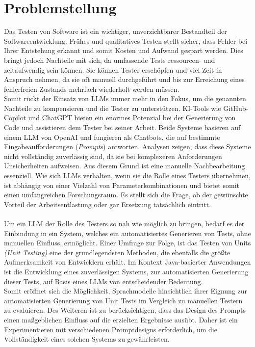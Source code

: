 \section{Problemstellung}
Das Testen von Software ist ein wichtiger, unverzichtbarer Bestandteil der Softwareentwicklung. Frühes und qualitatives Testen stellt sicher, dass
Fehler bei Ihrer Entstehung erkannt und somit Kosten und Aufwand gespart werden. Dies bringt jedoch Nachteile mit sich, da umfassende Tests ressourcen- und zeitaufwendig sein können. 
Sie können Tester erschöpfen und viel Zeit in Anspruch nehmen, da sie oft manuell durchgeführt und bis zur Erreichung eines fehlerfreien Zustands mehrfach wiederholt werden müssen. \cite{pargaonkar_study_2023}\\
Somit rückt der Einsatz von LLMs immer mehr in den Fokus, um die genannten Nachteile zu kompensieren und die Tester zu unterstützen. KI-Tools wie GitHub-Copilot und ChatGPT 
bieten ein enormes Potenzial bei der Generierung von Code und assistieren dem Tester bei seiner Arbeit. Beide Systeme basieren auf einem LLM von OpenAI 
und fungieren als Chatbots, die auf bestimmte Eingabeaufforderungen (\textit{Prompts}) antworten. Analysen zeigen, dass diese Systeme nicht vollständig zuverlässig sind, da sie bei komplexeren Anforderungen Unsicherheiten aufweisen. \cite{poldrack_ai-assisted_2023}
Aus diesem Grund ist eine manuelle Nachbearbeitung essenziell.
Wie sich LLMs verhalten, wenn sie die Rolle eines Testers übernehmen, ist abhängig von einer Vielzahl von Parameterkombinationen und bietet somit einen 
umfangreichen Forschungsraum. Es stellt sich die Frage, ob der gewünschte Vorteil der Arbeitsentlastung oder gar Ersetzung tatsächlich eintritt.
\\\\Um ein LLM der Rolle des Testers so nah wie möglich zu bringen, bedarf es der Einbindung in ein System, welches ein automatisiertes Generieren von Tests, ohne manuellen
Einfluss, ermöglicht. Einer Umfrage zur Folge, ist das Testen von Units \textit{(Unit Testing)} eine der grundlegendsten Methoden, die ebenfalls die größte Aufmerksamkeit von Entwicklern erhält. \cite{garousi_survey_2013}
Im Kontext Java-basierter Anwendungen ist die Entwicklung eines zuverlässigen Systems, zur automatisierten Generierung dieser Tests, auf Basis eines LLMs von entscheidender Bedeutung.\\
Somit eröffnet sich die Möglichkeit, Sprachmodelle hinsichtlich ihrer Eignung zur automatisierten Generierung von Unit Tests im Vergleich zu manuellen Testern zu evaluieren.
Des Weiteren ist zu berücksichtigen, dass das Design des Prompts einen maßgeblichen Einfluss auf die erzielten Ergebnisse ausübt. Daher ist ein Experimentieren mit verschiedenen Promptdesigns erforderlich, um die Vollständigkeit eines solchen Systems zu gewährleisten.


